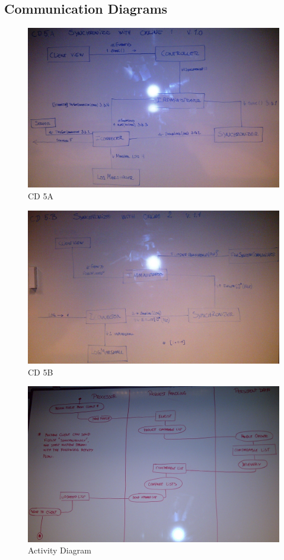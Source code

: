 \subsection{Communication Diagrams}
\begin{figure}[H]
  \includegraphics[width=\textwidth]{illustrations/CD5A.jpg}
  \caption{CD 5A}
  \label{CD5A}
\end{figure}
\begin{figure}[H]
  \includegraphics[width=\textwidth]{illustrations/CD5B.jpg}
  \caption{CD 5B}
  \label{CD5B}
\end{figure}
\begin{figure}[H]
  \includegraphics[width=\textwidth,natwidth=2456,natheight=1522]{illustrations/ActivityDiagram.jpg}
  \caption{Activity Diagram}
  \label{activitydiagram}
\end{figure}
\newpage